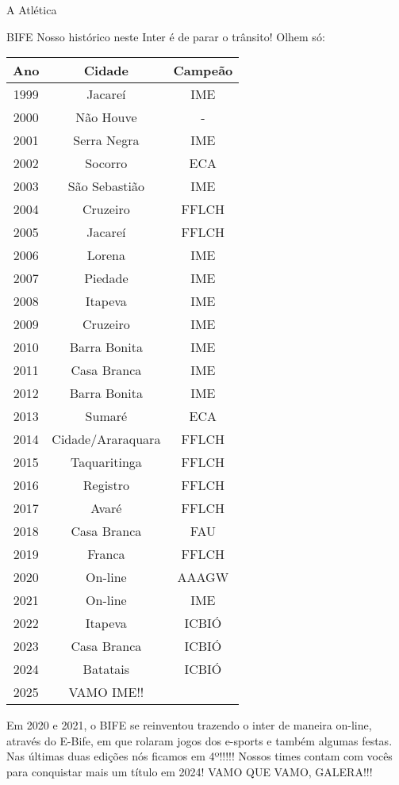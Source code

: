 \begin{secao}{A Atlética}
\begin{subsecao}{BIFE}
Nosso histórico neste Inter é de parar o trânsito! Olhem só:

\begin{center}
  \begin{tabular}{|c|c|c|}
   \hline
   Ano & Cidade & Campeão\\
   \hline
   1999 & Jacareí & IME\\
   2000 & Não Houve & - \\
   2001 & Serra Negra & IME\\
   2002 & Socorro & ECA\\
   2003 & São Sebastião & IME\\
   2004 & Cruzeiro & FFLCH\\
   2005 & Jacareí & FFLCH\\
   2006 & Lorena & IME\\
   2007 & Piedade & IME\\
   2008 & Itapeva & IME\\
   2009 & Cruzeiro & IME\\
   2010 & Barra Bonita & IME\\
   2011 & Casa Branca & IME\\
   2012 & Barra Bonita & IME\\
   2013 & Sumaré & ECA\\
   2014 & Cidade/Araraquara & FFLCH\\
   2015 & Taquaritinga & FFLCH\\
   2016 & Registro & FFLCH\\
   2017 & Avaré & FFLCH\\
   2018 & Casa Branca & FAU\\
   2019 & Franca & FFLCH\\
   2020 & On-line & AAAGW\\
   2021 & On-line & IME\\
   2022 & Itapeva & ICBIÓ\\
   2023 & Casa Branca & ICBIÓ\\
   2024 & Batatais & ICBIÓ\\
   2025 & VAMO IME!! & \\
   \hline
  \end{tabular}
\end{center}

Em 2020 e 2021, o BIFE se reinventou trazendo o inter de maneira on-line, através do
E-Bife, em que rolaram jogos dos e-sports e também algumas festas. Nas últimas 
duas edições nós ficamos em  4º!!!!! Nossos times contam com vocês para conquistar
mais um título em 2024! VAMO QUE VAMO, GALERA!!!



\end{subsecao}
\end{secao}
